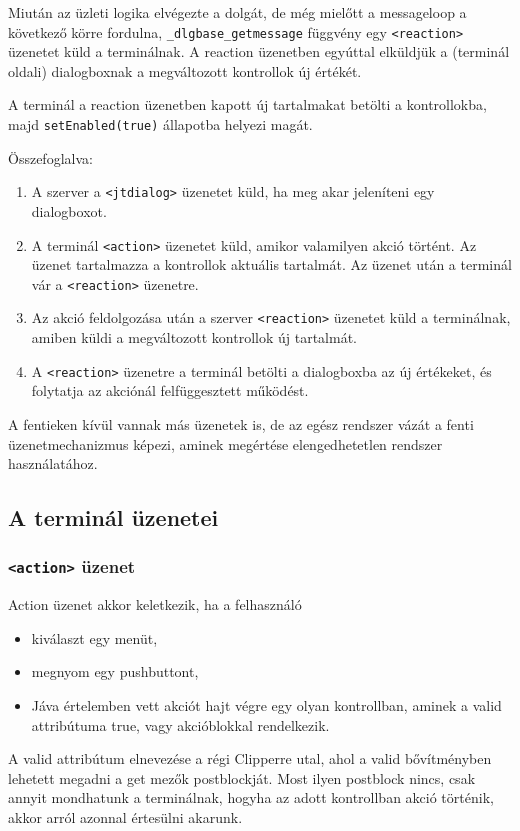 Miután az üzleti logika elvégezte a dolgát,
de még mielőtt a messageloop a következő körre fordulna,
\verb!_dlgbase_getmessage! függvény egy \verb!<reaction>!
üzenetet küld a terminálnak. A reaction üzenetben egyúttal
elküldjük a (terminál oldali) dialogboxnak a megváltozott 
kontrollok új értékét.

A terminál a reaction üzenetben kapott új tartalmakat betölti
a kontrollokba, majd \verb!setEnabled(true)! állapotba helyezi
magát.

Összefoglalva:

\begin{enumerate}
\item 
   A szerver a \verb!<jtdialog>! üzenetet küld, ha meg akar jeleníteni
   egy dialogboxot.
\item
   A terminál \verb!<action>! üzenetet küld, amikor valamilyen
   akció történt. Az üzenet tartalmazza a kontrollok aktuális
   tartalmát. Az üzenet után a terminál vár a \verb!<reaction>!
   üzenetre.
\item
   Az akció feldolgozása után a szerver \verb!<reaction>! 
   üzenetet küld a terminálnak, amiben küldi a megváltozott
   kontrollok új tartalmát.
\item 
   A \verb!<reaction>!  üzenetre a terminál betölti a dialogboxba
   az új értékeket, és folytatja az akciónál felfüggesztett működést.
\end{enumerate}

A fentieken kívül vannak más üzenetek is, de az egész rendszer
vázát a fenti üzenetmechanizmus képezi, aminek megértése elengedhetetlen
rendszer használatához.
 

\subsection{A terminál üzenetei}


\subsubsection{{\tt <action>} üzenet}
Action üzenet akkor keletkezik, ha a felhasználó
\begin{itemize}
  \item 
      kiválaszt egy menüt,
  \item 
      megnyom egy pushbuttont,
  \item 
      Jáva értelemben vett akciót hajt végre egy olyan kontrollban, 
      aminek a valid attribútuma true, 
      vagy  akcióblokkal rendelkezik.
\end{itemize}
A valid attribútum elnevezése a régi Clipperre utal, ahol a
valid bővítményben lehetett megadni a get mezők postblockját.
Most ilyen postblock nincs, csak annyit mondhatunk a terminálnak,
hogyha az adott kontrollban akció történik, akkor arról azonnal
értesülni akarunk. 

